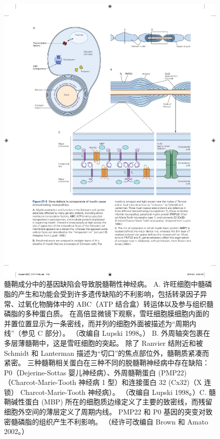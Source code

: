 \begin{figure}[htbp]
	\centering
	\includegraphics[width=0.95\linewidth]{chap57/fig_57_5}
	\caption{髓鞘成分中的基因缺陷会导致脱髓鞘性神经病。 A. 许旺细胞中髓磷脂的产生和功能会受到许多遗传缺陷的不利影响，包括转录因子异常、过氧化物酶体中的 ABC（ATP 结合盒）转运体以及参与组织髓磷脂的多种蛋白质。 在高倍显微镜下观察，雪旺细胞膜细胞内面的并置位置显示为一条密线，而并列的细胞外面被描述为“周期内线”（参见 C 部分）。 （改编自 Lupski 1998。） B. 外周轴突包裹在多层薄髓鞘中，这是雪旺细胞的突起。 除了 Ranvier 结附近和被 Schmidt 和 Lanterman 描述为“切口”的焦点部位外，髓鞘质紧凑而紧密。 三种髓鞘相关蛋白在三种不同的脱髓鞘神经病中存在缺陷：P0（Dejerine-Sottas 婴儿神经病）、外周髓鞘蛋白 (PMP22)（Charcot-Marie-Tooth 神经病 1 型）和连接蛋白 32 (Cx32)（X 连锁） Charcot-Marie-Tooth 神经病）。 （改编自 Lupski 1998。）C. 髓鞘碱性蛋白 (MBP) 所在的细胞质边缘定义了主要的致密线，而残留细胞外空间的薄层定义了周期内线。 PMP22 和 P0 基因的突变对致密髓磷脂的组织产生不利影响。 （经许可改编自 Brown 和 Amato 2002。）}
	\label{fig:57_5}
\end{figure}


